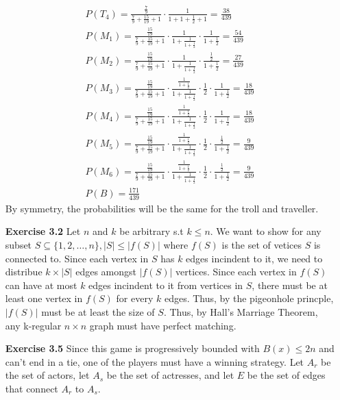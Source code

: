 \documentclass[10pt]{article}[H]
\begin{document}
\begin{itemize}
\begin{align*}
        P(T_4)=\frac{\frac{7}{9}}{\frac{7}{9}+\frac{15}{19}+1}\cdot\frac{1}{1+1+\frac{1}{2}+1}=\frac{38}{439}\\
        P(M_1)=\frac{\frac{15}{19}}{\frac{7}{9}+\frac{15}{19}+1}\cdot\frac{1}{1+\frac{1}{1+\frac{1}{2}}}\cdot\frac{1}{1+\frac{1}{2}}=\frac{54}{439}\\
        P(M_2)=\frac{\frac{15}{19}}{\frac{7}{9}+\frac{15}{19}+1}\cdot\frac{1}{1+\frac{1}{1+\frac{1}{2}}}\cdot\frac{\frac{1}{2}}{1+\frac{1}{2}}=\frac{27}{439}\\
        P(M_3)=\frac{\frac{15}{19}}{\frac{7}{9}+\frac{15}{19}+1}\cdot\frac{\frac{1}{1+\frac{1}{2}}}{1+\frac{1}{1+\frac{1}{2}}}\cdot\frac{1}{2}\cdot\frac{1}{1+\frac{1}{2}}=\frac{18}{439}\\
        P(M_4)=\frac{\frac{15}{19}}{\frac{7}{9}+\frac{15}{19}+1}\cdot\frac{\frac{1}{1+\frac{1}{2}}}{1+\frac{1}{1+\frac{1}{2}}}\cdot\frac{1}{2}\cdot\frac{1}{1+\frac{1}{2}}=\frac{18}{439}\\
        P(M_5)=\frac{\frac{15}{19}}{\frac{7}{9}+\frac{15}{19}+1}\cdot\frac{\frac{1}{1+\frac{1}{2}}}{1+\frac{1}{1+\frac{1}{2}}}\cdot\frac{1}{2}\cdot\frac{\frac{1}{2}}{1+\frac{1}{2}}=\frac{9}{439}\\
        P(M_6)=\frac{\frac{15}{19}}{\frac{7}{9}+\frac{15}{19}+1}\cdot\frac{\frac{1}{1+\frac{1}{2}}}{1+\frac{1}{1+\frac{1}{2}}}\cdot\frac{1}{2}\cdot\frac{\frac{1}{2}}{1+\frac{1}{2}}=\frac{9}{439}\\
        P(B)=\frac{171}{439}
    \end{align*} 
   By symmetry, the probabilities will be the same for the troll and traveller.
    \item [\textbf{Exercise 3.2}] Let $n$ and $k$ be arbitrary s.t $k\le n$. We want to show for any subset $S\subseteq\{1,2,\ldots,n\}, |S|\le|f(S)|$ where $f(S)$ is the set of vetices $S$ is connected to.
    Since each vertex in $S$ has $k$ edges incindent to it, we need to distribue $k\times|S|$ edges amongst $|f(S)|$ vertices. 
    Since each vertex in $f(S)$ can have at most $k$ edges incindent to it from vertices in $S$, there must be at least one vertex in $f(S)$ for every $k$ edges. Thus, by the pigeonhole princple, $|f(S)|$ must be at least the size of $S$. 
    Thus, by Hall's Marriage Theorem, any k-regular $n\times n$ graph must have perfect matching.
    \item [\textbf{Exercise 3.5}] Since this game is progressively bounded with $B(x)\le 2n$ and can't end in a tie, one of the players must have a winning strategy. 
    Let $A_r$ be the set of actors, let $A_s$ be the set of actresses, and let $E$ be the set of edges that connect $A_r$ to $A_s$. 

\end{itemize}
\end{document}

